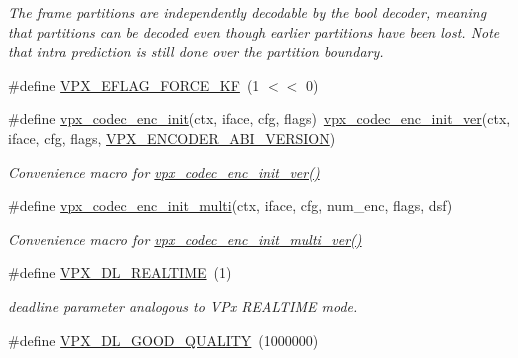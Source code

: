 \begin{DoxyCompactItemize}
\begin{DoxyCompactList}\small\item\em The frame partitions are independently decodable by the bool decoder, meaning that partitions can be decoded even though earlier partitions have been lost. Note that intra prediction is still done over the partition boundary. \end{DoxyCompactList}\item 
\#define \hyperlink{group__encoder_ga4c4f4e3cbb5225d2c6c050e2d1e948fa}{V\+P\+X\+\_\+\+E\+F\+L\+A\+G\+\_\+\+F\+O\+R\+C\+E\+\_\+\+KF}~(1 $<$$<$ 0)
\item 
\#define \hyperlink{group__encoder_ga3d490a2a9a6acd7c9ef82a603155f3cf}{vpx\+\_\+codec\+\_\+enc\+\_\+init}(ctx,  iface,  cfg,  flags)~\hyperlink{group__encoder_ga1472ec347010fe5ef32766a299e57cc4}{vpx\+\_\+codec\+\_\+enc\+\_\+init\+\_\+ver}(ctx, iface, cfg, flags, \hyperlink{group__encoder_gaa4f0b52293c08ba672429c3a03648b9d}{V\+P\+X\+\_\+\+E\+N\+C\+O\+D\+E\+R\+\_\+\+A\+B\+I\+\_\+\+V\+E\+R\+S\+I\+ON})
\begin{DoxyCompactList}\small\item\em Convenience macro for \hyperlink{group__encoder_ga1472ec347010fe5ef32766a299e57cc4}{vpx\+\_\+codec\+\_\+enc\+\_\+init\+\_\+ver()} \end{DoxyCompactList}\item 
\#define \hyperlink{group__encoder_gad7ae1d930cf110d6fe70beafeacfd9c7}{vpx\+\_\+codec\+\_\+enc\+\_\+init\+\_\+multi}(ctx,  iface,  cfg,  num\+\_\+enc,  flags,  dsf)
\begin{DoxyCompactList}\small\item\em Convenience macro for \hyperlink{group__encoder_ga1c0415984a5469687f53613a5471f53d}{vpx\+\_\+codec\+\_\+enc\+\_\+init\+\_\+multi\+\_\+ver()} \end{DoxyCompactList}\item 
\#define \hyperlink{group__encoder_ga04253cc9ec1146d72fa8bb86bcf32144}{V\+P\+X\+\_\+\+D\+L\+\_\+\+R\+E\+A\+L\+T\+I\+ME}~(1)\hypertarget{group__encoder_ga04253cc9ec1146d72fa8bb86bcf32144}{}\label{group__encoder_ga04253cc9ec1146d72fa8bb86bcf32144}

\begin{DoxyCompactList}\small\item\em deadline parameter analogous to V\+Px R\+E\+A\+L\+T\+I\+ME mode. \end{DoxyCompactList}\item 
\#define \hyperlink{group__encoder_ga5d00a9f9e10b9f49ca91e72c1f01c9fd}{V\+P\+X\+\_\+\+D\+L\+\_\+\+G\+O\+O\+D\+\_\+\+Q\+U\+A\+L\+I\+TY}~(1000000)\hypertarget{group__encoder_ga5d00a9f9e10b9f49ca91e72c1f01c9fd}{}\label{group__encoder_ga5d00a9f9e10b9f49ca91e72c1f01c9fd}


\end{DoxyCompactItemize}
